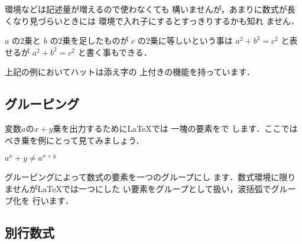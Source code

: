 環境などは記述量が増えるので使わなくても
構いませんが，あまりに数式が長くなり見づらいときには
環境で入れ子にするとすっきりするかも知れ
ません．
%
\begin{InOut}
$a$ の2乗と $b$ の2乗を足したものが
$c$ の2乗に等しいという事は 
\( a^2 + b^2 = c^2 \) と表せるが 
\begin{math}  a^2 + b^2 = c^2
\end{math} と書く事もできる．
\end{InOut}
上記の例においてハット\qu{\string^}は添え字の
上付きの機能を持っています．


\subsection{グルーピング}
%
%
変数$a$の$x+y$乗を出力するために{\LaTeX}では
一塊の要素をで{}
します．ここではべき乗を例にとって見てみましょう．
\begin{InOut}
\( a^x+y \neq a^{x+y} \)
\end{InOut}
グルーピングによって数式の要素を一つのグループにし
ます．数式環境に限りませんが{\LaTeX}では一つにした
い要素をグループとして扱い，波括弧でグループ化を
行います．


\subsection{別行数式}%

